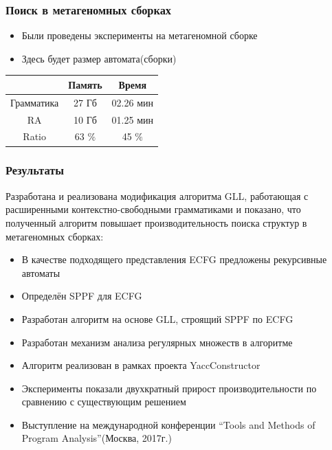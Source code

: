 \documentclass{beamer}
\begin{document}
	\begin{frame} 
		\frametitle{Поиск в метагеномных сборках} 
        \begin{itemize}
            \item Были проведены эксперименты на метагеномной сборке
            \item Здесь будет размер автомата(сборки)
        \end{itemize}
		\begin{center}
            
		\vspace{40pt}
		\begin{tabular}{ | c | c | c | }
			\hline
			             &  Память & Время   \\ \hline
			Грамматика  &  27 Гб   & 02.26 мин \\ \hline
			RA &  10  Гб   &  01.25 мин \\ \hline \hline
			Ratio   &  63 $\%$     &  45 $\%$ \\ \hline
		\end{tabular}
		\end{center}
	\end{frame}

	\begin{frame} 
		\frametitle{Результаты}
		Разработана и реализована модификация алгоритма GLL,
		работающая с расширенными контекстно-свободными грамматиками и показано, что полученный
		алгоритм повышает производительность поиска структур в метагеномных сборках:
		\begin{itemize}
			\item В качестве подходящего представления ECFG предложены рекурсивные автоматы
			\item Определён SPPF для ECFG
			\item Разработан алгоритм на основе GLL, строящий SPPF по ECFG
            \item Разработан механизм анализа регулярных множеств в алгоритме
			\item Алгоритм реализован в рамках проекта YaccConstructor
			\item Эксперименты показали двухкратный прирост производительности по сравнению с существующим решением 
			\item Выступление на международной конференции ``Tools and Methods of Program Analysis''(Москва, 2017г.)
		\end{itemize}		
	\end{frame}
\end{document}
